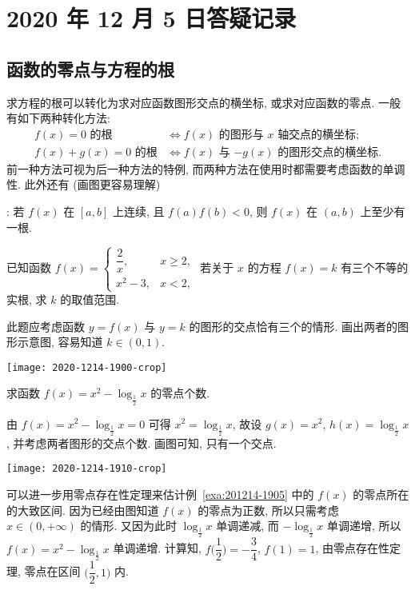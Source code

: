 \section{2020 年 12 月 5 日答疑记录}

\subsection{函数的零点与方程的根}

  求方程的根可以转化为求对应函数图形交点的横坐标, 或求对应函数的零点. 
  一般有如下两种转化方法:
  \begin{align*}
    f(x)=0\text{\ 的根}&\Leftrightarrow 
      \text{$f(x)$ 的图形与 $x$ 轴交点的横坐标};\\
    f(x)+g(x)=0\text{\ 的根}&\Leftrightarrow 
      \text{$f(x)$ 与 $-g(x)$ 的图形交点的横坐标}.
  \end{align*}
  前一种方法可视为后一种方法的特例, 而两种方法在使用时都需要考虑函数的单调性.
  此外还有 (画图更容易理解)
  
  : 若 $f(x)$ 在 $[a,b]$ 上连续, 且 $f(a)f(b)<0$, 
  则 $f(x)$ 在 $(a,b)$ 上至少有一根. 

\begin{example}\label{exa:201217-1900}
    已知函数 $f(x)= \begin{cases}
        \dfrac2x, & x\geqslant 2,\\
        x^2-3, & x<2,
    \end{cases}$ 若关于 $x$ 的方程 $f(x)=k$ 有三个不等的实根, 求 $k$ 的取值范围.
\end{example}
\begin{solution}
    此题应考虑函数 $y=f(x)$ 与 $y=k$ 的图形的交点恰有三个的情形. 画出两者的图形示意图, 容易知道 $k\in(0,1)$.
    
    \begin{center}
        \texttt{[image: 2020-1214-1900-crop]}
    \end{center}
\end{solution}

\begin{example}\label{exa:201214-1905}
    求函数 $f(x)=x^2-\log_{\frac12} x$ 的零点个数.
\end{example}
\begin{solution}
    由 $f(x)=x^2-\log_{\frac12} x=0$ 可得 $x^2=\log_{\frac12} x$, 故设 $g(x)=x^2$, $h(x)=\log_{\frac12} x$, 并考虑两者图形的交点个数. 画图可知, 只有一个交点.
    
    \begin{center}
        \texttt{[image: 2020-1214-1910-crop]}
    \end{center}
\end{solution}
\begin{remark}
    可以进一步用零点存在性定理来估计例~\ref{exa:201214-1905} 中的 $f(x)$ 的零点所在的大致区间. 因为已经由图知道 $f(x)$ 的零点为正数, 所以只需考虑 $x\in(0,+\infty)$ 的情形. 又因为此时 $\log_{\frac12} x$ 单调递减, 而 $-\log_{\frac12} x$ 单调递增, 所以 $f(x)=x^2-\log_{\frac12} x$ 单调递增. 计算知, $f\biggl(\dfrac12\biggr)=-\dfrac34$, $f(1)=1$, 由零点存在性定理, 零点在区间 $\biggl(\dfrac12,1\biggl)$ 内.
\end{remark}

